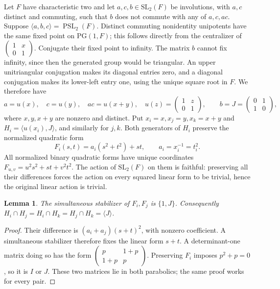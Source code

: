 \documentclass[11pt,a4paper]{article}
\newtheorem{lemma}{Lemma}\newtheorem{theorem}[lemma]{Theorem}
\newcommand{\gen}[1]{\langle #1\rangle}
\newcommand{\PSL}{\operatorname{PSL}}
\begin{document}
Let $F$ have characteristic two and let $a,c,b\in\mathrm{SL}_2(F)$ be
involutions, with $a,c$ distinct and commuting, such that $b$ does not
commute with any of $a,c,ac$. Suppose $\gen{a,b,c}=\PSL_2(F)$.
Distinct commuting nonidentity unipotents have the same fixed point on
$\mathrm{PG}(1,F)$; this follows directly from the centralizer of
$\left(\begin{smallmatrix}1&x\\0&1\end{smallmatrix}\right)$.
Conjugate their fixed point to infinity. The matrix $b$ cannot fix
infinity, since then the generated group would be triangular. An upper
unitriangular conjugation makes its diagonal entries zero, and a diagonal
conjugation makes its lower-left entry one, using the unique square root
in $F$. We therefore have
\[
 a=u(x),\quad c=u(y),\quad ac=u(x+y),\quad
 u(z)=\begin{pmatrix}1&z\\0&1\end{pmatrix},\qquad
 b=J=\begin{pmatrix}0&1\\1&0\end{pmatrix},                 \tag{6}
\]
where $x,y,x+y$ are nonzero and distinct.
Put $x_i=x,x_j=y,x_k=x+y$ and $H_i=\gen{u(x_i),J}$, and similarly
for $j,k$. Both generators of $H_i$ preserve the normalized quadratic form
\[
 F_i(s,t)=a_i(s^2+t^2)+st,\qquad a_i=x_i^{-1}=t_i^2.
\]
All normalized binary quadratic forms have unique coordinates
$F_{u,v}=u^2s^2+st+v^2t^2$. The action of $\mathrm{SL}_2(F)$ on them
is faithful: preserving all their differences forces the action on every
squared linear form to be trivial, hence the original linear action is
trivial.

\begin{lemma}\label{evenpair}
The simultaneous stabilizer of $F_i,F_j$ is $\{1,J\}$. Consequently
$H_i\cap H_j=H_i\cap H_k=H_j\cap H_k=\gen J$.
\end{lemma}
\begin{proof}
Their difference is $(a_i+a_j)(s+t)^2$, with nonzero coefficient.
A simultaneous stabilizer therefore fixes the linear form $s+t$.
A determinant-one matrix doing so has the form
$\left(\begin{smallmatrix}p&1+p\\1+p&p\end{smallmatrix}\right)$.
Preserving $F_i$ imposes $p^2+p=0$, so it is $I$ or $J$.
These two matrices lie in both parabolics; the same proof works for every pair.
\end{proof}
\end{document}
